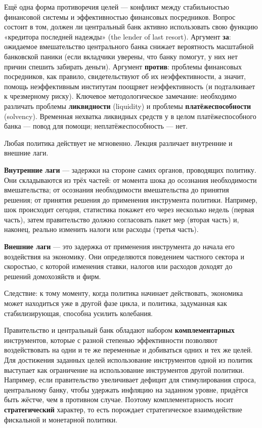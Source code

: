 \documentclass[11pt,a4paper]{article}
\begin{document}

Ещё одна форма противоречия целей --- конфликт между стабильностью финансовой системы и эффективностью финансовых посредников. Вопрос состоит в том, должен ли центральный банк активно использовать свою функцию «кредитора последней надежды» (the lender of last resort). Аргумент \textbf{за}: ожидаемое вмешательство центрального банка снижает вероятность масштабной банковской паники (если вкладчики уверены, что банку помогут, у них нет причин спешить забирать деньги). Аргумент \textbf{против}: проблемы финансовых посредников, как правило, свидетельствуют об их неэффективности, а значит, помощь неэффективным институтам поощряет неэффективность (и подталкивает к чрезмерному риску). Ключевое методологическое замечание: необходимо различать проблемы \textbf{ликвидности} (liquidity) и проблемы \textbf{платёжеспособности} (solvency). Временная нехватка ликвидных средств у в целом платёжеспособного банка --- повод для помощи; неплатёжеспособность --- нет.


Любая политика действует не мгновенно. Лекция различает внутренние и внешние лаги.

\textbf{Внутренние лаги} --- задержки на стороне самих органов, проводящих политику. Они складываются из трёх частей: от момента шока до осознания необходимости вмешательства; от осознания необходимости вмешательства до принятия решения; от принятия решения до применения инструмента политики. Например, шок происходит сегодня, статистика покажет его через несколько недель (первая часть), затем правительство должно согласовать пакет мер (вторая часть) и, наконец, реально изменить налоги или расходы (третья часть).

\textbf{Внешние лаги} --- это задержка от применения инструмента до начала его воздействия на экономику. Они определяются поведением частного сектора и скоростью, с которой изменения ставки, налогов или расходов доходят до решений домохозяйств и фирм.

Следствие: к тому моменту, когда политика начинает действовать, экономика может находиться уже в другой фазе цикла, и политика, задуманная как стабилизирующая, способна усилить колебания.


Правительство и центральный банк обладают набором \textbf{комплементарных} инструментов, которые с разной степенью эффективности позволяют воздействовать на одни и те же переменные и добиваться одних и тех же целей. Для достижения заданных целей использование инструментов одной из политик выступает как ограничение на использование инструментов другой политики. Например, если правительство увеличивает дефицит для стимулирования спроса, центральному банку, чтобы удержать инфляцию на заданном уровне, придётся быть жёстче, чем в противном случае. Поэтому комплементарность носит \textbf{стратегический} характер, то есть порождает стратегическое взаимодействие фискальной и монетарной политики.
\end{document}

